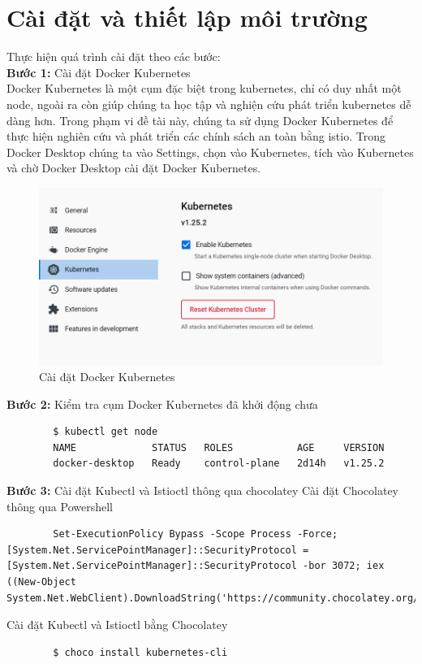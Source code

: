 \documentclass[12pt,a4paper]{report}
\begin{document}
{{	\section{Cài đặt và thiết lập môi trường}
	Thực hiện quá trình cài đặt theo các bước:\\
	\textbf{Bước 1:} Cài đặt Docker Kubernetes\\
	Docker Kubernetes là một cụm đặc biệt trong kubernetes, chỉ có duy nhất một node, ngoài ra còn giúp chúng ta học tập và nghiện cứu phát triển kubernetes dễ dàng hơn. Trong phạm vi đề tài này, chúng ta sử dụng Docker Kubernetes để thực hiện nghiên cứu và phát triển các chính sách an toàn bằng istio. Trong Docker Desktop chúng ta vào Settings, chọn vào Kubernetes, tích vào Kubernetes và chờ Docker Desktop  cài đặt Docker Kubernetes.
	
	\begin{figure}[h!]
		\centering
		\includegraphics[width=0.65\linewidth]{Pics/3.2-1}
		\caption{Cài đặt Docker Kubernetes}
		\label{fig:3.2-1}
	\end{figure}
	
	\textbf{Bước 2:} Kiểm tra cụm Docker Kubernetes đã khởi động chưa
	\begin{lstlisting}
		$ kubectl get node
		NAME             STATUS   ROLES           AGE     VERSION
		docker-desktop   Ready    control-plane   2d14h   v1.25.2
	\end{lstlisting}
	\textbf{Bước 3:} Cài đặt Kubectl và Istioctl thông qua chocolatey
	Cài đặt Chocolatey thông qua Powershell
	\begin{lstlisting}
		Set-ExecutionPolicy Bypass -Scope Process -Force; [System.Net.ServicePointManager]::SecurityProtocol = [System.Net.ServicePointManager]::SecurityProtocol -bor 3072; iex ((New-Object System.Net.WebClient).DownloadString('https://community.chocolatey.org/install.ps1'))
	\end{lstlisting}
	
	Cài đặt Kubectl và Istioctl bằng Chocolatey
	\begin{lstlisting}
		$ choco install kubernetes-cli
		

\end{lstlisting}}}
\end{document}
